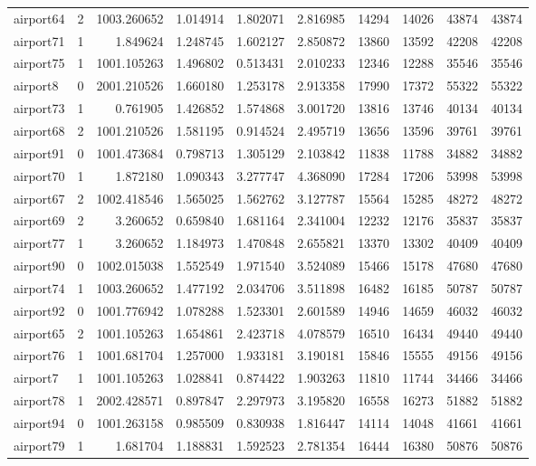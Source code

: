 \begin{longtable}{|l|r|r|r|r|r|r|r|r|r|}
airport64 & 2 & 1003.260652 & 1.014914 & 1.802071 & 2.816985 & 14294 & 14026 & 43874 & 43874 \\
airport71 & 1 & 1.849624 & 1.248745 & 1.602127 & 2.850872 & 13860 & 13592 & 42208 & 42208 \\
airport75 & 1 & 1001.105263 & 1.496802 & 0.513431 & 2.010233 & 12346 & 12288 & 35546 & 35546 \\
airport8 & 0 & 2001.210526 & 1.660180 & 1.253178 & 2.913358 & 17990 & 17372 & 55322 & 55322 \\
airport73 & 1 & 0.761905 & 1.426852 & 1.574868 & 3.001720 & 13816 & 13746 & 40134 & 40134 \\
airport68 & 2 & 1001.210526 & 1.581195 & 0.914524 & 2.495719 & 13656 & 13596 & 39761 & 39761 \\
airport91 & 0 & 1001.473684 & 0.798713 & 1.305129 & 2.103842 & 11838 & 11788 & 34882 & 34882 \\
airport70 & 1 & 1.872180 & 1.090343 & 3.277747 & 4.368090 & 17284 & 17206 & 53998 & 53998 \\
airport67 & 2 & 1002.418546 & 1.565025 & 1.562762 & 3.127787 & 15564 & 15285 & 48272 & 48272 \\
airport69 & 2 & 3.260652 & 0.659840 & 1.681164 & 2.341004 & 12232 & 12176 & 35837 & 35837 \\
airport77 & 1 & 3.260652 & 1.184973 & 1.470848 & 2.655821 & 13370 & 13302 & 40409 & 40409 \\
airport90 & 0 & 1002.015038 & 1.552549 & 1.971540 & 3.524089 & 15466 & 15178 & 47680 & 47680 \\
airport74 & 1 & 1003.260652 & 1.477192 & 2.034706 & 3.511898 & 16482 & 16185 & 50787 & 50787 \\
airport92 & 0 & 1001.776942 & 1.078288 & 1.523301 & 2.601589 & 14946 & 14659 & 46032 & 46032 \\
airport65 & 2 & 1001.105263 & 1.654861 & 2.423718 & 4.078579 & 16510 & 16434 & 49440 & 49440 \\
airport76 & 1 & 1001.681704 & 1.257000 & 1.933181 & 3.190181 & 15846 & 15555 & 49156 & 49156 \\
airport7 & 1 & 1001.105263 & 1.028841 & 0.874422 & 1.903263 & 11810 & 11744 & 34466 & 34466 \\
airport78 & 1 & 2002.428571 & 0.897847 & 2.297973 & 3.195820 & 16558 & 16273 & 51882 & 51882 \\
airport94 & 0 & 1001.263158 & 0.985509 & 0.830938 & 1.816447 & 14114 & 14048 & 41661 & 41661 \\
airport79 & 1 & 1.681704 & 1.188831 & 1.592523 & 2.781354 & 16444 & 16380 & 50876 & 50876 \\

\end{longtable}
